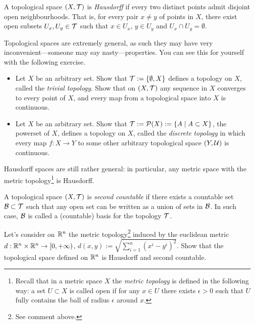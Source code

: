 \begin{definition}
  A topological space $(X, \mathcal{T})$ is \emph{Hausdorff} if every two distinct points admit disjoint open neighbourhoods. That is, for every pair $x\neq y$ of points in $X$, there exist open subsets $U_x, U_y\in\mathcal{T}$ such that $x\in U_x$, $y\in U_y$ and $U_x \cap U_y = \emptyset$.
\end{definition}

Topological spaces are extremely general, as such they may have very inconvenient---someone may say nasty---properties.
You can see this for yourself with the following exercise.

\begin{exercise}
  \begin{itemize}
    \item Let $X$ be an arbitrary set. Show that $\mathcal{T}:=\{\emptyset, X\}$ defines a topology on $X$, called the \emph{trivial topology}. Show that on $(X, \mathcal{T})$ any sequence in $X$ converges to every point of $X$, and every map from a topological space into $X$ is continuous.
    \item Let $X$ be an arbitrary set. Show that $\mathcal{T}:=\mathcal{P}(X) := \{ A \mid A\subset X \}$, the powerset of $X$, defines a topology on $X$, called the \emph{discrete topology} in which every map $f : X \to Y$ to some other arbitrary topological space $(Y, \mathcal{U})$ is continuous.
  \end{itemize}
\end{exercise}

Hausdorff spaces are still rather general: in particular, any metric space with the metric topology\footnote{Recall that in a metric space $X$ the \emph{metric topology} is defined in the following way: a set $U\subset X$ is called open if for any $x\in U$ there exists $\epsilon>0$ such that $U$ fully contains the ball of radius $\epsilon$ around $x$.} is Hausdorff.

\begin{definition}
  A topological space $(X, \mathcal{T})$ is \emph{second countable} if there exists a countable set $\mathcal{B}\subset\mathcal{T}$ such that any open set can be written as a union of sets in $\mathcal{B}$.
  In such case, $\mathcal{B}$ is called a (countable) basis for the topology $\mathcal{T}$.
\end{definition}

\begin{exercise}\label{exe:rntopsp}
  Let's consider on $\mathbb{R}^n$ the metric topology\footnote{See comment above.} induced by the euclidean metric $d: \mathbb{R}^n \times \mathbb{R}^n \to [0, +\infty)$, $d(x,y) := \sqrt{\sum_{i=1}^n (x^i-y^i)^2}$.
  Show that the topological space defined on $\mathbb{R}^n$ is Hausdorff and second countable.
\end{exercise}

